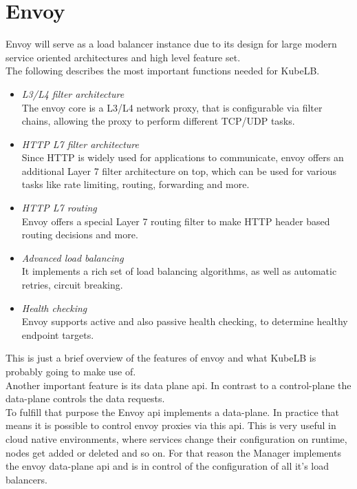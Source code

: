 \section{Envoy}\label{sec:envoy}

Envoy will serve as a load balancer instance due to its design for large modern service oriented architectures and high level feature set.
\\
The following describes the most important functions needed for KubeLB.

\begin{itemize}
    \item \textit{L3/L4 filter architecture} \\
    The envoy core is a L3/L4 network proxy, that is configurable via filter chains, allowing the proxy to perform different TCP/UDP tasks.
    \item \textit{HTTP L7 filter architecture} \\
    Since HTTP is widely used for applications to communicate, envoy offers an additional Layer 7 filter architecture on top, which can be used for various tasks like rate limiting, routing, forwarding and more.
    \item \textit{HTTP L7 routing} \\
    Envoy offers a special Layer 7 routing filter to make HTTP header based routing decisions and more.
    \item \textit{Advanced load balancing} \\
    It implements a rich set of load balancing algorithms, as well as automatic retries, circuit breaking.
    \item \textit{Health checking} \\
    Envoy supports active and also passive health checking, to determine healthy endpoint targets.
\end{itemize}

This is just a brief overview of the features of envoy and what KubeLB is probably going to make use of.~\cite{WHAT-IS-ENVOY}
\\
Another important feature is its data plane api.
In contrast to a control-plane the data-plane controls the data requests.
\\
To fulfill that purpose the Envoy api implements a data-plane.
In practice that means it is possible to control envoy proxies via this api.
This is very useful in cloud native environments, where services change their configuration on runtime, nodes get added or deleted and so on.
For that reason the Manager implements the envoy data-plane api and is in control of the configuration of all it's load balancers.
